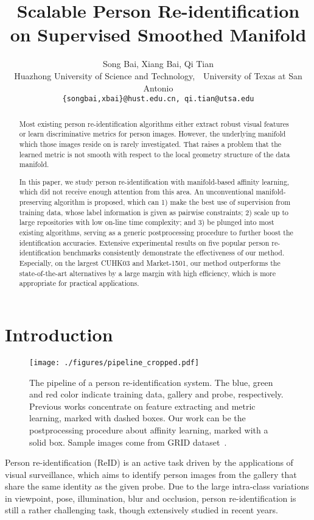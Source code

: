 \documentclass[10pt,twocolumn,letterpaper]{article}
\begin{document}
\title{Scalable Person Re-identification on Supervised Smoothed Manifold}

\author{Song Bai, Xiang Bai, Qi Tian\\
Huazhong University of Science and Technology,~~University of Texas at San Antonio\\
{\tt\small\{songbai,xbai\}@hust.edu.cn,~qi.tian@utsa.edu}
}

\maketitle


\begin{abstract}
Most existing person re-identification algorithms either extract robust visual features or learn discriminative metrics for person images. However, the underlying manifold which those images reside on is rarely investigated. That raises a problem that the learned metric is not smooth with respect to the local geometry structure of the data manifold.

In this paper, we study person re-identification with manifold-based affinity learning, which did not receive enough attention from this area. An unconventional manifold-preserving algorithm is proposed, which can 1) make the best use of supervision from training data, whose label information is given as pairwise constraints; 2) scale up to large repositories with low on-line time complexity; and 3) be plunged into most existing algorithms, serving as a generic postprocessing procedure to further boost the identification accuracies. Extensive experimental results on five popular person re-identification benchmarks consistently demonstrate the effectiveness of our method. Especially, on the largest CUHK03 and Market-1501, our method outperforms the state-of-the-art alternatives by a large margin with high efficiency, which is more appropriate for practical applications.
\end{abstract}

\section{Introduction}
\begin{figure*}[tb]
\centering
\texttt{[image: ./figures/pipeline\_cropped.pdf]}
\caption{The pipeline of a person re-identification system. The blue, green and red color indicate training data, gallery and probe, respectively. Previous works concentrate on feature extracting and metric learning, marked with dashed boxes. Our work can be the postprocessing procedure about affinity learning, marked with a solid box. Sample images come from GRID dataset~\cite{GRID1}.}
\label{fig:pipeline}
\vspace{-2ex}
\end{figure*}
Person re-identification (ReID) is an active task driven by the applications of visual surveillance, which aims to identify person images from the gallery that share the same identity as the given probe.
Due to the large intra-class variations in viewpoint, pose, illumination, blur and occlusion, person re-identification is still a rather challenging task, though extensively studied in recent years.
\end{document}
